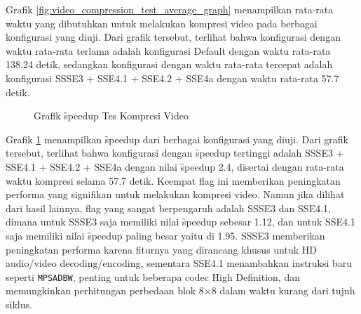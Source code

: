 Grafik \ref{fig:video_compression_test_average_graph} menampilkan rata-rata waktu yang dibutuhkan untuk melakukan kompresi video pada berbagai konfigurasi yang diuji. Dari grafik tersebut, terlihat bahwa konfigurasi dengan waktu rata-rata terlama adalah konfigurasi Default dengan waktu rata-rata 138.24 detik, sedangkan konfigurasi dengan waktu rata-rata tercepat adalah konfigurasi SSSE3 + SSE4.1 + SSE4.2 + SSE4a dengan waktu rata-rata 57.7 detik.

\begin{figure}
    \centering
    \caption{Grafik \f{speedup} Tes Kompresi Video}
    \label{fig:video_compression_test_graph}
\end{figure}

Grafik \ref{fig:video_compression_test_graph} menampilkan \f{speedup} dari berbagai konfigurasi yang diuji. Dari grafik tersebut, terlihat bahwa konfigurasi dengan \f{speedup} tertinggi adalah SSSE3 + SSE4.1 + SSE4.2 + SSE4a dengan nilai \f{speedup} 2.4, disertai dengan rata-rata waktu kompresi selama 57.7 detik. Keempat flag ini memberikan peningkatan performa yang signifikan untuk melakukan kompresi video. Namun jika dilihat dari hasil lainnya, flag yang sangat berpengaruh adalah SSSE3 dan SSE4.1, dimana untuk SSSE3 saja memiliki nilai \f{speedup} sebesar 1.12, dan untuk SSE4.1 saja memiliki nilai \f{speedup} paling besar yaitu di 1.95. SSSE3 memberikan peningkatan performa karena fiturnya yang dirancang khusus untuk HD audio/video decoding/encoding, sementara SSE4.1 menambahkan instruksi baru seperti \texttt{MPSADBW}, penting untuk beberapa codec \f{High Definition}, dan memungkinkan perhitungan perbedaan blok 8×8 dalam waktu kurang dari tujuh siklus.

